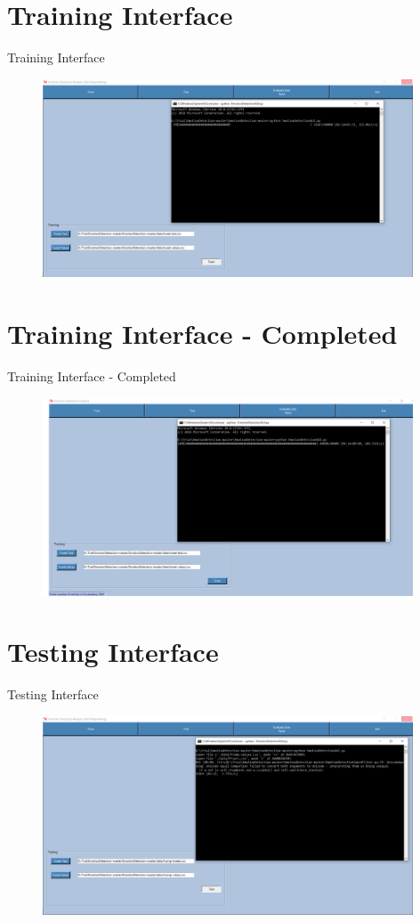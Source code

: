 \documentclass{beamer}
\begin{document}
\section{Training Interface}
\begin{frame}{Training Interface}
\begin{figure}[H]
\centering
\includegraphics[width=110mm]{TrainingGUI.png}
\end{figure}
\end{frame}

\section{Training Interface - Completed}
\begin{frame}{Training Interface - Completed}
\begin{figure}[H]
\centering
\includegraphics[width=110mm]{TrainingGUI-Complete.png}
\end{figure}
\end{frame}

\section{Testing Interface}
\begin{frame}{Testing Interface}
\begin{figure}[H]
\centering
\includegraphics[width=110mm]{TestingGUI.png}
\end{figure}
\end{frame}
\end{document}
